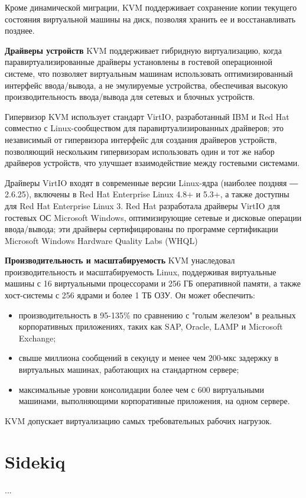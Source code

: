 Кроме динамической миграции, KVM поддерживает сохранение копии текущего состояния виртуальной машины на диск, позволяя хранить ее и восстанавливать позднее.

\textbf{Драйверы устройств}
KVM поддерживает гибридную виртуализацию, когда паравиртуализированные драйверы установлены в гостевой операционной системе, что позволяет виртуальным машинам использовать оптимизированный интерфейс ввода/вывода, а не эмулируемые устройства, обеспечивая высокую производительность ввода/вывода для сетевых и блочных устройств.

Гипервизор KVM использует стандарт VirtIO, разработанный IBM и Red Hat совместно с Linux-сообществом для паравиртуализированных драйверов; это независимый от гипервизора интерфейс для создания драйверов устройств, позволяющий нескольким гипервизорам использовать один и тот же набор драйверов устройств, что улучшает взаимодействие между гостевыми системами.

Драйверы VirtIO входят в современные версии Linux-ядра (наиболее поздняя ― 2.6.25), включены в Red Hat Enterprise Linux 4.8+ и 5.3+, а также доступны для Red Hat Enterprise Linux 3. Red Hat разработала драйверы VirtIO для гостевых ОС Microsoft Windows, оптимизирующие сетевые и дисковые операции ввода/вывода; эти драйверы сертифицированы по программе сертификации Microsoft Windows Hardware Quality Labs (WHQL)

\textbf{Производительность и масштабируемость}
KVM унаследовал производительность и масштабируемость Linux, поддерживая виртуальные машины с 16 виртуальными процессорами и 256 ГБ оперативной памяти, а также хост-системы с 256 ядрами и более 1 ТБ ОЗУ. Он может обеспечить:

\begin{itemize}
  \item производительность в 95-135\% по сравнению с "голым железом" в реальных корпоративных приложениях, таких как SAP, Oracle, LAMP и Microsoft Exchange;
  \item свыше миллиона сообщений в секунду и менее чем 200-мкс задержку в виртуальных машинах, работающих на стандартном сервере;
  \item максимальные уровни консолидации более чем с 600 виртуальными машинами, выполняющими корпоративные приложения, на одном сервере.
\end{itemize}

KVM допускает виртуализацию самых требовательных рабочих нагрузок.

\section{Sidekiq}\label{sec:ch3/sect5}
...

